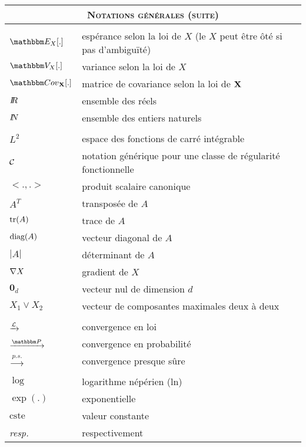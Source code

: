 \begin{center}
\begin{tabular}{ll}
\multicolumn{2}{c}{\textsc{\large Notations g\'en\'erales (suite)}} \\
\hline
& \\
$\E_X[.]$ & esp\'erance selon la loi de $X$ (le $X$ peut \^etre ôt\'e si pas d'ambiguït\'e) \\
$\V_X[.]$ & variance selon la loi de $X$  \\
$\Cov_{\bX}[.]$ & matrice de covariance selon la loi de ${\mathbf{X}}$  \\
$I\!\!R$ & ensemble des r\'eels \\
$I\!\!N$ & ensemble des entiers naturels \\
& \\
$L^2$ & espace des fonctions de carr\'e int\'egrable \\
${\cal{C}}$ & notation g\'en\'erique pour une classe de r\'egularit\'e fonctionnelle \\
$<.,.>$ & produit scalaire canonique \\
$A^T$ & transpos\'ee de $A$ \\
$\text{tr}(A)$ & trace de $A$ \\
$\text{diag}(A)$ & vecteur diagonal de $A$  \\
$|A|$ & d\'eterminant de $A$ \\
$\nabla X$ & gradient de $X$ \\
$\boldsymbol{0}_d$ & vecteur nul de dimension $d$ \\   %
$X_1 \vee X_2 $ & vecteur de composantes maximales deux à deux \\
& \\
$\xrightarrow{\cal{L}} $ & convergence en loi \\
$\xrightarrow{\Pm} $ & convergence en probabilit\'e \\
$\xrightarrow{p.s.} $ & convergence presque sûre \\
& \\
$\log$ & logarithme n\'ep\'erien (ln) \\
$\exp(.)$ & exponentielle  \\
$\text{cste}$ & valeur constante \\
{\it resp.} & respectivement \\
\hline
\end{tabular}
\end{center}


\clearpage

